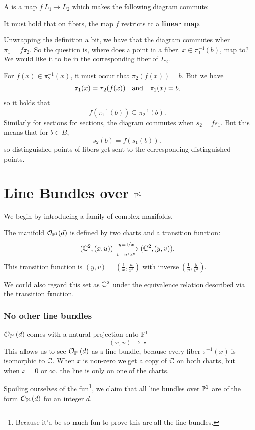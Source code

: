 \documentclass[12pt]{memoir}
\begin{document}
\begin{Def}
    A  is a map $f\: L_1\to L_2$ which makes the following diagram commute:
    \begin{center}
    \end{center}
    It must hold that on fibers, the map $f$ restricts to a \textbf{linear map}.
\end{Def}

Unwrapping the definition a bit, we have that the diagram commutes when $\pi_1=f\pi_2$. So the question is, where does a point in a fiber, $x\in\pi^{-1}_1(b)$, map to? We would like it to be in the corresponding fiber of $L_2$.\par 
For $f(x)\in\pi_2^{-1}(x)$, it must occur that $\pi_2(f(x))=b$. But we have 
$$\pi_1(x)=\pi_2(f(x))\quad\text{and}\quad\pi_1(x)=b,$$
so it holds that 
$$f\left(\pi^{-1}_1(b)\right)\subseteq \pi_2^{-1}(b).$$
Similarly for sections for sections, the diagram commutes when $s_2=fs_1$. But this means that for $b\in B$, 
$$s_2(b)=f(s_1(b)),$$
so distinguished points of fibers get sent to the corresponding distinguished points.

\section{Line Bundles over $\mathbb{P}^1$}

We begin by introducing a family of complex manifolds.

\begin{Def}
    The manifold $\mathcal{O}_{\mathbb{P}^1}(d)$ is defined by two charts and a transition function:
    $$(\mathbb{C}^2,(x,u))\xrightarrow[v=u/x^d]{y=1/x}(\mathbb{C}^2,(y,v)).$$
    This transition function is  $(y,v)=\left(\frac{1}{x},\frac{u}{x^d}\right)$ with inverse $\left(\frac{1}{y},\frac{y}{v^d}\right)$.
\end{Def}
We could also regard this set as $\mathbb{C}^2$ under the equivalence relation described via the transition function.

\subsubsection{No other line bundles}
$\mathcal{O}_{\mathbb{P}^1}(d)$ comes with a natural projection onto $\mathbb{P}^1$ 
$$(x,u)\mapsto x$$
This allows us to see $\mathcal{O}_{\mathbb{P}^1}(d)$ as a line bundle, because every fiber $\pi^{-1}(x)$ is isomorphic to $\mathbb{C}$. When $x$ is non-zero we get a copy of $\mathbb{C}$ on both charts, but when $x=0$ or $\infty$, the line is only on one of the charts.\par 
Spoiling ourselves of the fun\footnote{Because it'd be so much fun to prove this are all the line bundles.}, we claim that all line bundles over $\mathbb{P}^1$ are of the form $\mathcal{O}_{\mathbb{P}^1}(d)$ for an integer $d$. 
\end{document}
